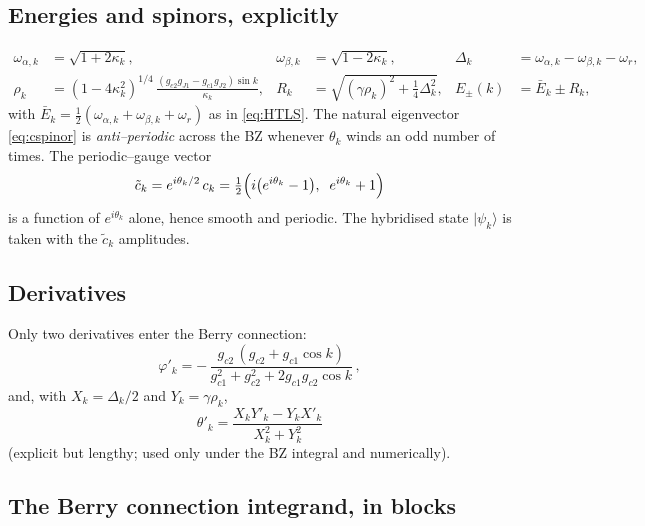 \documentclass[11pt]{article}
\newcommand{\kk}{\kappa_k}
\newcommand{\oa}{\omega_{\alpha,k}}
\newcommand{\ob}{\omega_{\beta,k}}
\newcommand{\ket}[1]{\lvert #1 \rangle}
\begin{document}
\subsection{Energies and spinors, explicitly}

\begin{align}
  \oa &= \sqrt{1+2\kk}, &
  \ob &= \sqrt{1-2\kk}, &
  \Delta_k &= \oa-\ob-\omega_r, \\
  \rho_k &= (1-4\kk^{2})^{1/4}\,\frac{(g_{c2}g_{J1}-g_{c1}g_{J2})\sin k}{\kk}, &
  R_k &= \sqrt{(\gamma\rho_k)^{2}+\tfrac14\Delta_k^{2}}, &
  E_{\pm}(k) &= \bar E_k\pm R_k ,
\end{align}
with $\bar E_k=\tfrac12(\oa+\ob+\omega_r)$ as in \eqref{eq:HTLS}.
The natural eigenvector \eqref{eq:cspinor} is \emph{anti--periodic} across the BZ
whenever $\theta_k$ winds an odd number of times. The periodic--gauge vector
\begin{equation}\label{eq:cP}
  \tilde c_k = e^{i\theta_k/2}\,c_k
             = \tfrac12\Bigl(i\bigl(e^{i\theta_k}-1\bigr),\;\; e^{i\theta_k}+1\Bigr)
\end{equation}
is a function of $e^{i\theta_k}$ alone, hence smooth and periodic. The hybridised
state $\ket{\psi_k}$ is taken with the $\tilde c_k$ amplitudes.

\subsection{Derivatives}

Only two derivatives enter the Berry connection:
\begin{equation}\label{eq:phid}
  \varphi'_k
   = -\,\frac{g_{c2}\,(g_{c2}+g_{c1}\cos k)}
             {g_{c1}^{2}+g_{c2}^{2}+2g_{c1}g_{c2}\cos k}\,,
\end{equation}
and, with $X_k=\Delta_k/2$ and $Y_k=\gamma\rho_k$,
\begin{equation}\label{eq:thetad}
  \theta'_k=\frac{X_k Y'_k-Y_k X'_k}{X_k^{2}+Y_k^{2}}
\end{equation}
(explicit but lengthy; used only under the BZ integral and numerically).

\subsection{The Berry connection integrand, in blocks}
\end{document}
